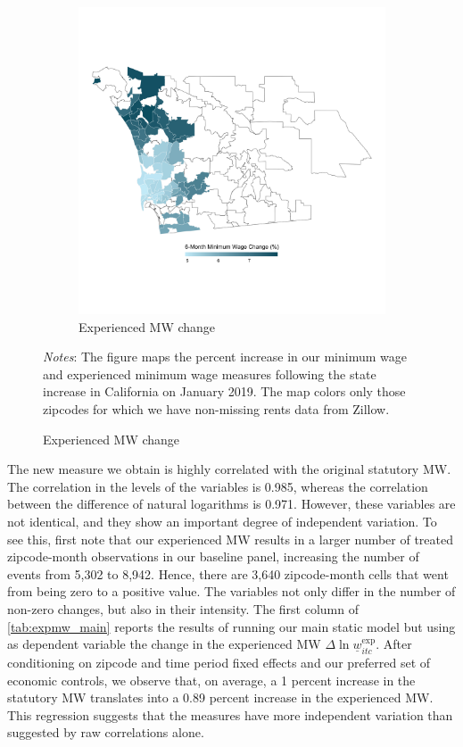 \begin{figure}
\begin{subfigure}[b]{0.65\textwidth}
		\caption{Experienced MW change}
		\includegraphics[width = \textwidth]
		{../../analysis/descriptive_maps/output/San_Diego_expmw_msa.png}
	\end{subfigure}
	\begin{minipage}{0.95\textwidth} \footnotesize
		\vspace{2mm} 
		\textit{Notes}: The figure maps the percent increase in our minimum wage and 
		experienced minimum wage measures following the state increase in California
		on January 2019. The map colors only those zipcodes for which we have 
		non-missing rents data from Zillow.
	\end{minipage}
\end{figure}

The new measure we obtain is highly correlated with the original statutory MW. The 
correlation in the levels of the variables is 0.985, whereas the correlation between the 
difference of natural logarithms is 0.971. %
However, these variables are not identical, and they show an important degree of independent 
variation. To see this, first note that our experienced MW results in a larger number of 
treated zipcode-month observations in our baseline panel, increasing the number of events 
from 5,302 to 8,942. %
Hence, there are 3,640 zipcode-month cells that went from being zero to a positive value. 
The variables not only differ in the number of non-zero changes, but also in their intensity. 
The first column of \autoref{tab:expmw_main} reports the results of running our main static 
model but using as dependent variable the change in the experienced MW $\Delta \ln 
\underline{w}_{itc}^{\text{exp}}$. After conditioning on zipcode and time period fixed effects
and our preferred set of economic controls, we observe that, on average, a 1 percent increase 
in the statutory MW translates into a 0.89 percent increase in the experienced MW. This 
regression suggests that the measures have more independent variation than suggested by 
raw correlations alone.

